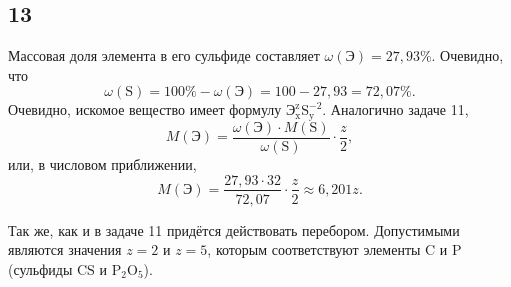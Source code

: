\subsection{13}

Массовая доля элемента в его сульфиде составляет $\omega(\text{Э})=27{,}93\%$. Очевидно, что
\[
\omega(\mathrm{S})=100\%-\omega(\text{Э})=100-27{,}93=72{,}07\%.
\]
Очевидно, искомое вещество имеет формулу $\mathrm{\text{Э}_x^{z}S_y^{-2}}$. Аналогично задаче 11,
\[
M(\text{Э})=\frac{\omega(\text{Э})\cdot M(\mathrm{S})}{\omega(\mathrm{S})}\cdot\frac{z}{2},
\]
или, в числовом приближении,
\[
M(\text{Э})=\frac{27{,}93\cdot32}{72{,}07}\cdot\frac{z}{2}\approx6{,}201z.
\]

Так же, как и в задаче 11 придётся действовать перебором. Допустимыми являются значения $z=2$ и $z=5$, которым соответствуют элементы $\mathrm{C}$ и $\mathrm{P}$ (сульфиды $\mathrm{CS}$ и $\mathrm{P_2O_5}$).
